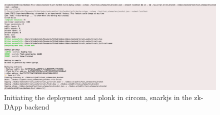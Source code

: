 \begin{figure}[hbt]
	\centering
		\includegraphics[width=1.0\textwidth]{Pictures/second-cmd.png}
	\caption{Initiating the deployment and plonk in circom, snarkjs in the zk-DApp backend}
	\label{fig:second-cmd}
\end{figure}

